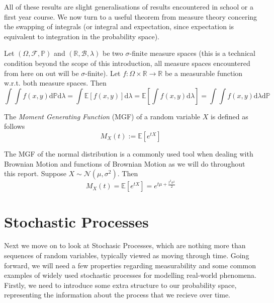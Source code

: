 All of these results are slight generalisations of results encountered in school or 
a first year course. We now turn to a useful theorem from measure theory concering 
the swapping of integrals (or integral and expectation, since expectation is 
equivalent to integration in the probability space).

\begin{theorem}
    Let $(\Omega,\mathcal{F},\mathbb{P})$ and $(\mathbb{R},\mathcal{B},\lambda)$
    be two $\sigma$-finite measure spaces (this is a technical condition beyond the 
    scope of this introduction, all measure spaces encountered from here on out will
    be $\sigma$-finite). Let $f:\Omega\times\mathbb{R}\rightarrow\mathbb{R}$ be a 
    measurable function w.r.t. both measure spaces. Then
    \begin{equation}\label{eq:1.13}
        \int\int f(x,y)\mathrm d\mathbb{P}\mathrm d\lambda=\int\mathbb{E}[f(x,y)]\mathrm d\lambda=\mathbb{E}\left[\int f(x,y)\mathrm d\lambda\right]=\int \int f(x,y)\mathrm d\lambda\mathrm d\mathbb{P}
    \end{equation}
\end{theorem}

\begin{definition}
    The \emph{Moment Generating Function} (MGF) of a random variable $X$ is defined as follows
    \begin{equation}
        M_X(t):=\mathbb{E}[e^{tX}]
    \end{equation}
\end{definition}

\begin{remark}
    The MGF of the normal distribution is a commonly used tool when dealing with
    Brownian Motion and functions of Brownian Motion as we will do throughout this
    report. Suppose $X\sim\mathcal{N}(\mu,\sigma^2)$. Then
    \begin{equation}
        M_X(t)=\mathbb{E}[e^{tX}]=e^{t\mu+\frac{t^2\sigma^2}{2}}
    \end{equation}
\end{remark}

\section{Stochastic Processes}\label{sec:1.4}

Next we move on to look at Stochasic Processes, which are nothing more than sequences
of random variables, typically viewed as moving through time. Going forward, we will 
need a few properties regarding measurability and some common examples of widely used 
stochastic processes for modelling real-world phenomena. Firstly, we need to introduce 
some extra structure to our probability space, representing the information about the 
process that we recieve over time.

